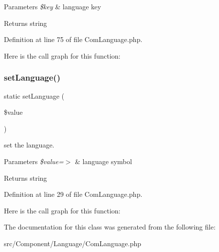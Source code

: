 \begin{DoxyParams}{Parameters}
{\em \$key} & language key\\
\hline
\end{DoxyParams}
\begin{DoxyReturn}{Returns}
string 
\end{DoxyReturn}


Definition at line 75 of file Com\+Language.\+php.

Here is the call graph for this function\+:
\mbox{\label{class_zest_1_1_component_1_1_language_1_1_com_language_ac8a46cd0f5e5c850c5ea9b79d481de1f}} 
\subsubsection{\texorpdfstring{set\+Language()}{setLanguage()}}
{\footnotesize\ttfamily static set\+Language (\begin{DoxyParamCaption}\item[{}]{\$value }\end{DoxyParamCaption})\hspace{0.3cm}{\ttfamily [static]}}

set the language.


\begin{DoxyParams}{Parameters}
{\em \$value=$>$} & language symbol\\
\hline
\end{DoxyParams}
\begin{DoxyReturn}{Returns}
string 
\end{DoxyReturn}


Definition at line 29 of file Com\+Language.\+php.

Here is the call graph for this function\+:


The documentation for this class was generated from the following file\+:\begin{DoxyCompactItemize}
\item 
src/\+Component/\+Language/Com\+Language.\+php\end{DoxyCompactItemize}
